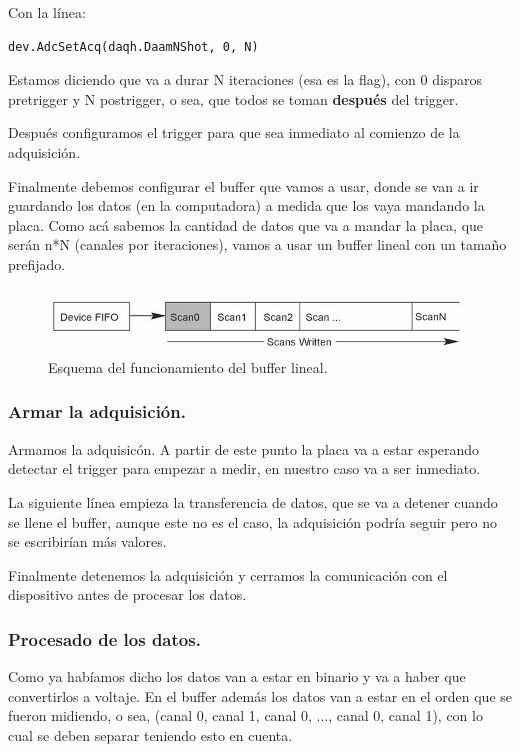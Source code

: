 Con la línea: 
\begin{lstlisting}
dev.AdcSetAcq(daqh.DaamNShot, 0, N)
\end{lstlisting}
Estamos diciendo que va a durar N iteraciones (esa es la flag), con 0 disparos pretrigger y N postrigger, o sea, que todos se toman \textbf{después} del trigger.

Después configuramos el trigger para que sea inmediato al comienzo de la adquisición.

Finalmente debemos configurar el buffer que vamos a usar, donde se van a ir guardando los datos (en la computadora) a medida que los vaya mandando la placa. Como acá sabemos la cantidad de datos que va a mandar la placa, que serán n*N (canales por iteraciones), vamos a usar un buffer lineal con un tamaño prefijado.

\begin{figure}[th!]
	\centering
	\includegraphics[width=0.7654\linewidth]{Figures/09_06_2025/Buffer_lineal}
	\caption{Esquema del funcionamiento del buffer lineal.}
	\label{fig:bufferlineal}
\end{figure}

\subsubsection*{Armar la adquisición.}
Armamos la adquisicón. A partir de este punto la placa va a estar esperando detectar el trigger para empezar a medir, en nuestro caso va a ser inmediato. 

La siguiente línea empieza la transferencia de datos, que se va a detener cuando se llene el buffer, aunque este no es el caso, la adquisición podría seguir pero no se escribirían más valores. 

Finalmente detenemos la adquisición y cerramos la comunicación con el dispositivo antes de procesar los datos. 

\subsubsection*{Procesado de los datos.}
Como ya habíamos dicho los datos van a estar en binario y va a haber que convertirlos a voltaje. En el buffer además los datos van a estar en el orden que se fueron midiendo, o sea, (canal 0, canal 1, canal 0, ..., canal 0, canal 1), con lo cual se deben separar teniendo esto en cuenta.

